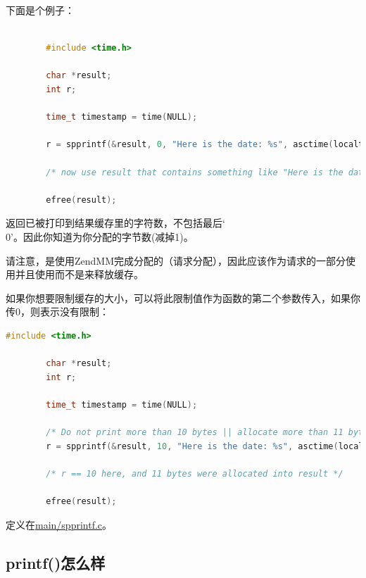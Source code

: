 下面是个例子：

\begin{lstlisting}[language=c]

        #include <time.h>

        char *result;
        int r;
        
        time_t timestamp = time(NULL);
        
        r = spprintf(&result, 0, "Here is the date: %s", asctime(localtime(&timestamp)));
        
        /* now use result that contains something like "Here is the date: Thu Jun 15 19:12:51 2017\n" */
        
        efree(result);  

\end{lstlisting} 


返回已被打印到结果缓存里的字符数，不包括最后‘\\0’。因此你知道为你分配的字节数(减掉1)。

请注意，是使用ZendMM完成分配的（请求分配），因此应该作为请求的一部分使用并且使用而不是来释放缓存。


如果你想要限制缓存的大小，可以将此限制值作为函数的第二个参数传入，如果你传0，则表示没有限制：

\begin{lstlisting}[language=c]
        #include <time.h>

        char *result;
        int r;

        time_t timestamp = time(NULL);

        /* Do not print more than 10 bytes || allocate more than 11 bytes */
        r = spprintf(&result, 10, "Here is the date: %s", asctime(localtime(&timestamp)));

        /* r == 10 here, and 11 bytes were allocated into result */

        efree(result);
\end{lstlisting}        


定义在\href{https://github.com/php/php-src/blob/648be8600ff89e1b0e4a4ad25cebad42b53bed6d/main/spprintf.c}{main/spprintf.c}。

\subsection{printf()怎么样}


